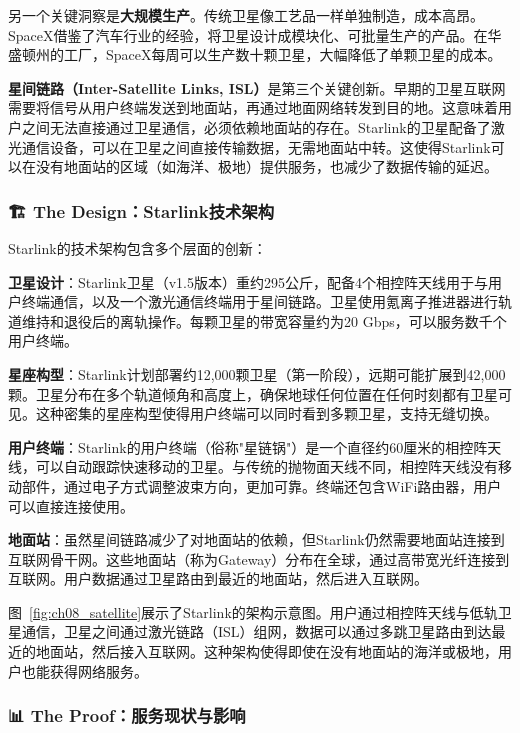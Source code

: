 另一个关键洞察是\textbf{大规模生产}。传统卫星像工艺品一样单独制造，成本高昂。SpaceX借鉴了汽车行业的经验，将卫星设计成模块化、可批量生产的产品。在华盛顿州的工厂，SpaceX每周可以生产数十颗卫星，大幅降低了单颗卫星的成本。

\textbf{星间链路（Inter-Satellite Links, ISL）}是第三个关键创新。早期的卫星互联网需要将信号从用户终端发送到地面站，再通过地面网络转发到目的地。这意味着用户之间无法直接通过卫星通信，必须依赖地面站的存在。Starlink的卫星配备了激光通信设备，可以在卫星之间直接传输数据，无需地面站中转。这使得Starlink可以在没有地面站的区域（如海洋、极地）提供服务，也减少了数据传输的延迟。

\subsubsection{🏗️ The Design：Starlink技术架构}

Starlink的技术架构包含多个层面的创新：

\textbf{卫星设计}：Starlink卫星（v1.5版本）重约295公斤，配备4个相控阵天线用于与用户终端通信，以及一个激光通信终端用于星间链路。卫星使用氪离子推进器进行轨道维持和退役后的离轨操作。每颗卫星的带宽容量约为20 Gbps，可以服务数千个用户终端。

\textbf{星座构型}：Starlink计划部署约12,000颗卫星（第一阶段），远期可能扩展到42,000颗。卫星分布在多个轨道倾角和高度上，确保地球任何位置在任何时刻都有卫星可见。这种密集的星座构型使得用户终端可以同时看到多颗卫星，支持无缝切换。

\textbf{用户终端}：Starlink的用户终端（俗称"星链锅"）是一个直径约60厘米的相控阵天线，可以自动跟踪快速移动的卫星。与传统的抛物面天线不同，相控阵天线没有移动部件，通过电子方式调整波束方向，更加可靠。终端还包含WiFi路由器，用户可以直接连接使用。

\textbf{地面站}：虽然星间链路减少了对地面站的依赖，但Starlink仍然需要地面站连接到互联网骨干网。这些地面站（称为Gateway）分布在全球，通过高带宽光纤连接到互联网。用户数据通过卫星路由到最近的地面站，然后进入互联网。

图~\ref{fig:ch08_satellite}展示了Starlink的架构示意图。用户通过相控阵天线与低轨卫星通信，卫星之间通过激光链路（ISL）组网，数据可以通过多跳卫星路由到达最近的地面站，然后接入互联网。这种架构使得即使在没有地面站的海洋或极地，用户也能获得网络服务。

\subsubsection{📊 The Proof：服务现状与影响}

